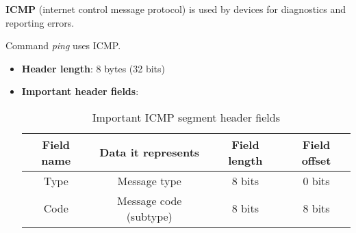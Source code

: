 \documentclass[a4paper]{article}
\begin{document}
  \vspace{1cm}


  \textbf{ICMP} (internet control message protocol) is used by devices for
  diagnostics and reporting errors.

  \begin{notes}
    \item Command \textit{ping} uses ICMP.
  \end{notes}

  \begin{itemize}
    \item \textbf{Header length}: 8 bytes (32 bits)
    \item \textbf{Important header fields}:
      \begin{table}[h]
        \centering
        \begin{tabular}{|c|c|c|c|}
          \hline
          Field name & Data it represents & Field length & Field offset \\
          \hline
          \hline
          Type & Message type & 8 bits & 0 bits \\
          \hline
          Code & Message code (subtype) & 8 bits & 8 bits \\
          \hline
        \end{tabular}
        \caption{Important ICMP segment header fields}
      \end{table}
  \end{itemize}
\end{document}
